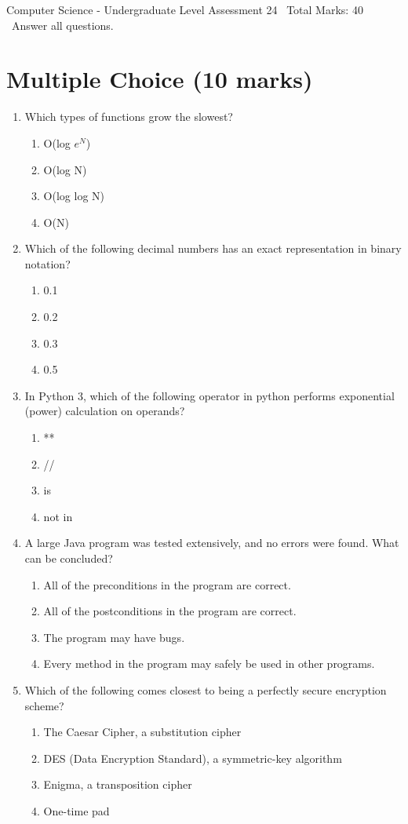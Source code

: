 \documentclass[12pt]{article}
\begin{document}
\begin{center}
Computer Science - Undergraduate Level Assessment 24 \
Total Marks: 40 \
Answer all questions.
\end{center}

\section*{Multiple Choice (10 marks)}
\begin{enumerate}[label=\arabic*.]
\item Which types of functions grow the slowest?
\begin{enumerate}[label=(\alph*)]
    \item O(log $e^N$)
    \item O(log N)
    \item O(log log N)
    \item O(N)
\end{enumerate}
\item Which of the following decimal numbers has an exact representation in binary notation?
\begin{enumerate}[label=(\alph*)]
    \item 0.1
    \item 0.2
    \item 0.3
    \item 0.5
\end{enumerate}
\item In Python 3, which of the following operator in python performs exponential (power) calculation on operands?
\begin{enumerate}[label=(\alph*)]
    \item **
    \item //
    \item is
    \item not in
\end{enumerate}
\item A large Java program was tested extensively, and no errors were found. What can be concluded?
\begin{enumerate}[label=(\alph*)]
    \item All of the preconditions in the program are correct.
    \item All of the postconditions in the program are correct.
    \item The program may have bugs.
    \item Every method in the program may safely be used in other programs.
\end{enumerate}
\item Which of the following comes closest to being a perfectly secure encryption scheme?
\begin{enumerate}[label=(\alph*)]
    \item The Caesar Cipher, a substitution cipher
    \item DES (Data Encryption Standard), a symmetric-key algorithm
    \item Enigma, a transposition cipher
    \item One-time pad
\end{enumerate}
\end{enumerate}
\end{document}
